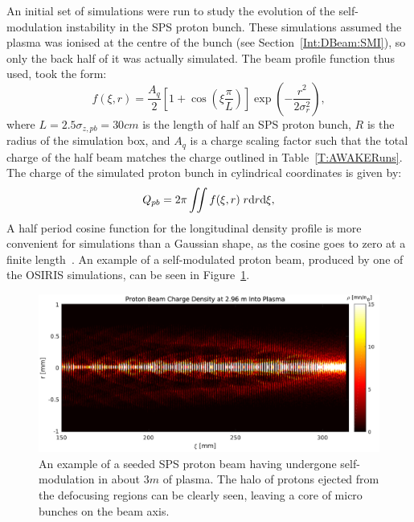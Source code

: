 An initial set of simulations were run to study the evolution of the self-modulation instability in the SPS proton bunch.
These simulations assumed the plasma was ionised at the centre of the bunch (see Section~\ref{Int:DBeam:SMI}), so only the back half of it was actually simulated.
The beam profile function thus used, took the form:
\begin{equation}
    f(\xi,r) = \frac{A_{q}}{2} \left[1 + \cos\left(\xi\frac{\pi}{L}\right)\right] \exp\left(-\frac{r^{2}}{2\sigma_{r}^{2}}\right), \label{EQ:SPS-Profile}
\end{equation}
where $L = 2.5\sigma_{z,pb} = 30\unit{cm}$ is the length of half an SPS proton bunch, $R$ is the radius of the simulation box, and $A_{q}$ is a charge scaling factor such that the total charge of the half beam matches the charge outlined in Table~\ref{T:AWAKERuns}.
The charge of the simulated proton bunch in cylindrical coordinates is given by:
\begin{equation}
    Q_{pb} = 2\pi \iint f(\xi,r) \;r \mathrm{d} r \mathrm{d} \xi, \label{EQ:SPS-Charge}
\end{equation}
A half period cosine function for the longitudinal density profile is more convenient for simulations than a Gaussian shape, as the cosine goes to zero at a finite length~\cite{lotov:2010}.
An example of a self-modulated proton beam, produced by one of the OSIRIS simulations, can be seen in Figure~\ref{Fig:Sim:SMI}.

\begin{figure}[hbt]
    \centering
    \includegraphics[width=1.0\linewidth]{figures/PBSelfModulation}
    \caption{\label{Fig:Sim:SMI} An example of a seeded SPS proton beam having undergone self-modulation in about $3\unit{m}$ of plasma. The halo of protons ejected from the defocusing regions can be clearly seen, leaving a core of micro bunches on the beam axis.}
\end{figure}

